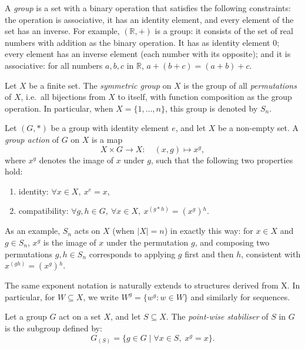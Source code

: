 \begin{definition}

    A \emph{group} is a set with a binary operation that satisfies the following constraints: the operation is associative, it has an identity element, and every element of the set has an inverse. For example, $(\mathbb{R}, +)$ is a group: it consists of the set of real numbers with addition as the binary operation. It has as identity element $0$; every element has an inverse element (each number with its opposite); and it is associative: for all numbers $a, b, c$ in $\mathbb{R}$, $a + (b + c) = (a+b) + c$.
    
    Let $X$ be a finite set. The \emph{symmetric group} on $X$ is the group of all \emph{permutations} of $X$, i.e.\ all bijections from $X$ to itself, with function composition as the group operation. In particular, when $X=\{1,\ldots,n\}$, this group is denoted by $S_n$.
    
    Let $(G, *)$ be a group with identity element $e$, and let $X$ be a non-empty set. A \emph{group action} of $G$ on $X$ is a map
    \[
    X \times G \to X : \quad (x,g) \mapsto x^g,
    \]
    where $x^g$ denotes the image of $x$ under $g$, such that the following two properties hold:
    \begin{enumerate}
        \item identity: $\forall x \in X,\ x^e = x$,
        \item compatibility: $\forall g, h \in G,\ \forall x \in X,\ x^{(g*h)} = (x^g){^h}$.
    \end{enumerate}

        
    As an example, $S_n$ acts on $X$ (when $|X|=n$) in exactly this way: for $x \in X$ and $g \in S_n$, $x^g$ is the image of $x$ under the permutation $g$, and composing two permutations $g,h \in S_n$ corresponds to applying $g$ first and then $h$, consistent with $x^{(gh)}=(x^g){^h}$.

    The same exponent notation is naturally extends to structures derived from X. In particular, for $W \subseteq X$, we write $W^g = \{w^g : w \in W\}$ and similarly for sequences.

    
    \end{definition}

\vspace{1em}

\begin{definition}\label{def:pointwise stabiliser}
  Let a group $G$ act on a set $X$, and let $S \subseteq X$.  
  The \emph{point-wise stabiliser} of $S$ in $G$ is the subgroup defined by:
  \[
  G_{(S)} = \{ g \in G \mid \forall x \in S,\; x^{g} = x \}.
  \]
\end{definition}

